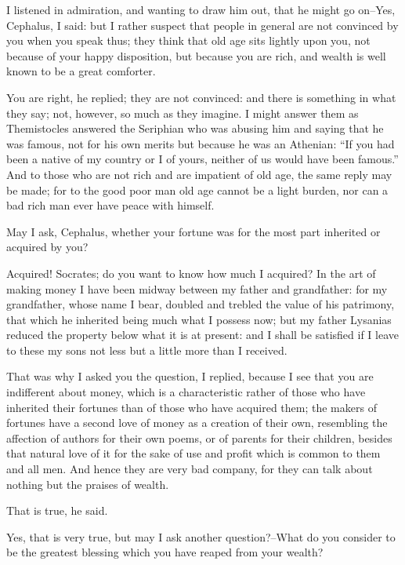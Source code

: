 I listened in admiration, and wanting to draw him out, that he might go
on--Yes, Cephalus, I said: but I rather suspect that people in general
are not convinced by you when you speak thus; they think that old
age sits lightly upon you, not because of your happy disposition, but
because you are rich, and wealth is well known to be a great comforter.

You are right, he replied; they are not convinced: and there is
something in what they say; not, however, so much as they imagine. I
might answer them as Themistocles answered the Seriphian who was abusing
him and saying that he was famous, not for his own merits but because he
was an Athenian: ``If you had been a native of my country or I of yours,
neither of us would have been famous.'' And to those who are not rich and
are impatient of old age, the same reply may be made; for to the good
poor man old age cannot be a light burden, nor can a bad rich man ever
have peace with himself.

May I ask, Cephalus, whether your fortune was for the most part
inherited or acquired by you?

Acquired! Socrates; do you want to know how much I acquired? In the art
of making money I have been midway between my father and grandfather:
for my grandfather, whose name I bear, doubled and trebled the value of
his patrimony, that which he inherited being much what I possess now;
but my father Lysanias reduced the property below what it is at present:
and I shall be satisfied if I leave to these my sons not less but a
little more than I received.

That was why I asked you the question, I replied, because I see that you
are indifferent about money, which is a characteristic rather of those
who have inherited their fortunes than of those who have acquired them;
the makers of fortunes have a second love of money as a creation of
their own, resembling the affection of authors for their own poems, or
of parents for their children, besides that natural love of it for the
sake of use and profit which is common to them and all men. And hence
they are very bad company, for they can talk about nothing but the
praises of wealth.

That is true, he said.

Yes, that is very true, but may I ask another question?--What do you
consider to be the greatest blessing which you have reaped from your
wealth?

